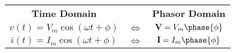 \begin{multicols}{2}

    \begin{CheatsheetEntryFrame}


        \newcommand{\X}{\hphantom{x}} %
        \begin{tabularx}{\textwidth}{ccC}
            {\scriptsize \textbf{Time Domain}}   &                             & {\scriptsize \textbf{Phasor Domain}} \\
            \X $v(t) = V_m \cos{(\omega t + \phi)}$ \X & $\Longleftrightarrow$ & $\mathbf{V} = V_m \phase{\phi}$      \\
            \X $i(t) = I_m \cos{(\omega t + \phi)}$ \X & $\Longleftrightarrow$ & $\mathbf{I} = I_m \phase{\phi}$      \\
        \end{tabularx}


        \vspace*{1ex}


\end{CheatsheetEntryFrame}
\end{multicols}
